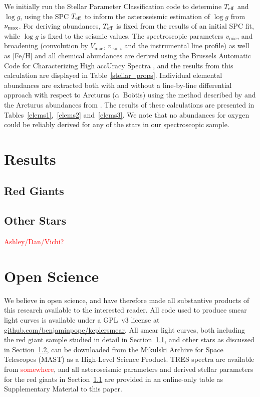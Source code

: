 \documentclass[a4paper,fleqn,usenatbib]{mnras}
\newcommand{\numax}{\mbox{$\nu_{\rm max}$}\xspace}
\newcommand{\teff}{\mbox{$T_{\rm eff}$}\xspace}
\newcommand{\logg}{\mbox{$\log g$}\xspace}
\begin{document}
We initially run the Stellar Parameter Classification \citep[SPC:][]{spc} code to determine \teff and \logg, using the SPC \teff to inform the asteroseismic estimation of \logg from \numax. For deriving abundances, \teff is fixed from the results of an initial SPC fit, while \logg is fixed to the seismic values. The spectroscopic parameters $v_{\text{mic}}$, and broadening (convolution by $V_{\text{mac}}$, $v_{\sin{i}}$ and the instrumental line profile) as well as [Fe/H] and all chemical abundances are derived using the Brussels Automatic Code for Characterizing High accUracy Spectra \citep[BACCHUS:][]{bacchus}, and the results from this calculation are displayed in Table~\ref{stellar_props}. Individual elemental abundances are extracted both with and without a line-by-line differential approach with respect to Arcturus ($\alpha$~Bo\"{o}tis) using the method described by \citet{gaiabenchmark4} and the Arcturus abundances from \citep{hawkinsapogee}. The results of these calculations are presented in Tables~\ref{elems1},~\ref{elems2} and~\ref{elems3}. We note that no abundances for oxygen could be reliably derived for any of the stars in our spectroscopic sample.







\section{Results}
\label{targets}

\subsection{Red Giants}
\label{rgs}

\subsection{Other Stars}
\label{other}

\textcolor{red}{Ashley/Dan/Vichi?}

\section{Open Science}
\label{open}

We believe in open science, and have therefore made all substantive products of this research available to the interested reader. All code used to produce smear light curves is available under a GPL~v3 license at \url{github.com/benjaminpope/keplersmear}. All smear light curves, both including the red giant sample studied in detail in Section~\ref{rgs}, and other stars as discussed in Section~\ref{other}, can be downloaded from the Mikulski Archive for Space Telescopes (MAST) as a High-Level Science Product. TRES spectra are available from \textcolor{red}{somewhere}, and all asteroseismic parameters and derived stellar parameters for the red giants in Section~\ref{rgs} are provided in an online-only table as Supplementary Material to this paper.
\end{document}
